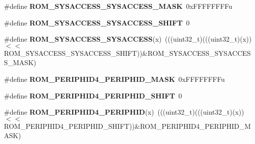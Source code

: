 \begin{DoxyCompactItemize}
\item 
\mbox{\label{group___r_o_m___register___masks_gab3acbf5e9fc0f3ad82ae4e0004d0216d}} 
\#define {\bfseries R\+O\+M\+\_\+\+S\+Y\+S\+A\+C\+C\+E\+S\+S\+\_\+\+S\+Y\+S\+A\+C\+C\+E\+S\+S\+\_\+\+M\+A\+SK}~0x\+F\+F\+F\+F\+F\+F\+F\+Fu
\item 
\mbox{\label{group___r_o_m___register___masks_ga3490b2f91c6a67625992dbc90f0e5a27}} 
\#define {\bfseries R\+O\+M\+\_\+\+S\+Y\+S\+A\+C\+C\+E\+S\+S\+\_\+\+S\+Y\+S\+A\+C\+C\+E\+S\+S\+\_\+\+S\+H\+I\+FT}~0
\item 
\mbox{\label{group___r_o_m___register___masks_ga169845d2d1c068c7ef4998e8801ac713}} 
\#define {\bfseries R\+O\+M\+\_\+\+S\+Y\+S\+A\+C\+C\+E\+S\+S\+\_\+\+S\+Y\+S\+A\+C\+C\+E\+SS}(x)~(((uint32\+\_\+t)(((uint32\+\_\+t)(x))$<$$<$R\+O\+M\+\_\+\+S\+Y\+S\+A\+C\+C\+E\+S\+S\+\_\+\+S\+Y\+S\+A\+C\+C\+E\+S\+S\+\_\+\+S\+H\+I\+FT))\&R\+O\+M\+\_\+\+S\+Y\+S\+A\+C\+C\+E\+S\+S\+\_\+\+S\+Y\+S\+A\+C\+C\+E\+S\+S\+\_\+\+M\+A\+SK)
\item 
\mbox{\label{group___r_o_m___register___masks_gad17e07925ea552218422be227581a58f}} 
\#define {\bfseries R\+O\+M\+\_\+\+P\+E\+R\+I\+P\+H\+I\+D4\+\_\+\+P\+E\+R\+I\+P\+H\+I\+D\+\_\+\+M\+A\+SK}~0x\+F\+F\+F\+F\+F\+F\+F\+Fu
\item 
\mbox{\label{group___r_o_m___register___masks_ga4ea3b3a45be6eb8eb4372f565af2d5d9}} 
\#define {\bfseries R\+O\+M\+\_\+\+P\+E\+R\+I\+P\+H\+I\+D4\+\_\+\+P\+E\+R\+I\+P\+H\+I\+D\+\_\+\+S\+H\+I\+FT}~0
\item 
\mbox{\label{group___r_o_m___register___masks_gab4f815fbbdfce7ff4af7ddeca74eff41}} 
\#define {\bfseries R\+O\+M\+\_\+\+P\+E\+R\+I\+P\+H\+I\+D4\+\_\+\+P\+E\+R\+I\+P\+H\+ID}(x)~(((uint32\+\_\+t)(((uint32\+\_\+t)(x))$<$$<$R\+O\+M\+\_\+\+P\+E\+R\+I\+P\+H\+I\+D4\+\_\+\+P\+E\+R\+I\+P\+H\+I\+D\+\_\+\+S\+H\+I\+FT))\&R\+O\+M\+\_\+\+P\+E\+R\+I\+P\+H\+I\+D4\+\_\+\+P\+E\+R\+I\+P\+H\+I\+D\+\_\+\+M\+A\+SK)
\item 
\mbox{\label{group___r_o_m___register___masks_ga39e8a3441c79c42651efba9100e653a7}} 

\end{DoxyCompactItemize}

